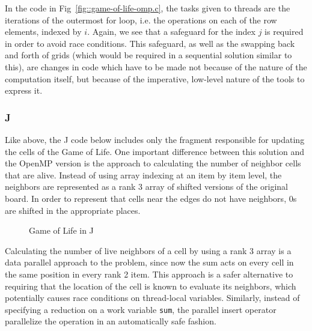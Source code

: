 In the code in Fig~\ref{fig::game-of-life-omp.c}, the tasks given to threads are the iterations of the outermost for loop, 
i.e. the operations on each of the row elements, indexed by $i$.
Again, we see that a safeguard for the index $j$ is required in order to avoid race conditions. 
This safeguard, as well as the swapping back and forth of grids (which would be required in a sequential solution similar to this), 
are changes in code which have to be made not because of the nature of the computation itself, 
but because of the imperative, low-level nature of the tools to express it.

\pagebreak

\subsubsection{J}
Like above, the J code below includes only the fragment responsible for updating the cells of the Game of Life. 
One important difference between this solution and the OpenMP version is 
the approach to calculating the number of neighbor cells that are alive.
Instead of using array indexing at an item by item level, 
the neighbors are represented as a rank 3 array of shifted versions of the original board. 
In order to represent that cells near the edges do not have neighbors, 
0s are shifted in the appropriate places.

\begin{figure}[h]
\begin{quote}
\begin{singlespacing}
\begin{small}
\end{small}
\end{singlespacing}
\end{quote}
\caption{Game of Life in J}
\label{fig::game-of-life.ijs}
\end{figure}


Calculating the number of live neighbors of a cell by using a rank 3 array 
is a data parallel approach to the problem, 
since now the sum acts on every cell in the same position in every rank 2 item. 
This approach is a safer alternative to requiring 
that the location of the cell is known to evaluate its neighbors, 
which potentially causes race conditions on thread-local variables.
Similarly, instead of specifying a reduction on a work variable \texttt{sum},
the parallel insert operator parallelize the operation in an automatically safe fashion.

